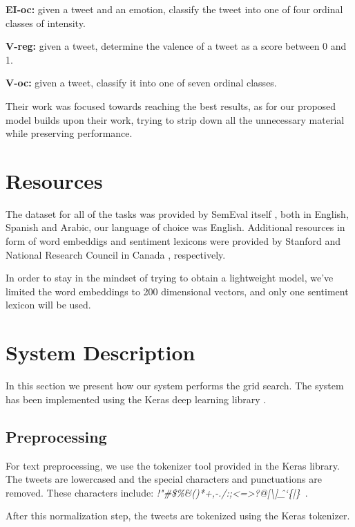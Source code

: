 \documentclass[10pt, a4paper]{article}
\begin{document}
\textbf{EI-oc:} given a tweet and an emotion, classify the tweet into one of four ordinal classes of intensity.

\textbf{V-reg:} given a tweet, determine the valence of a tweet as a score between 0 and 1.

\textbf{V-oc:} given a tweet, classify it into one of seven ordinal classes.


Their work was focused towards reaching the best results, as for our proposed model builds upon their work, trying to strip down all the unnecessary material while preserving performance.

\section{Resources}
The dataset for all of the tasks was provided by SemEval itself \citep{mohammed-semeval}, both in English, Spanish and Arabic, our language of choice was English. Additional resources in form of word embeddigs and sentiment lexicons were provided by Stanford \citep{glove} and National Research Council in Canada \citep{nrcic}, respectively. 

In order to stay in the mindset of trying to obtain a lightweight model, we've limited the word embeddings to 200 dimensional vectors, and only one sentiment lexicon will be used.


\section{System Description}
In this section we present how our system performs the grid search.
The system has been implemented using the Keras deep learning library \citep{chollet2015keras}.

\subsection{Preprocessing}
For text preprocessing, we use the tokenizer tool provided in the Keras library.
The tweets are lowercased and the special characters and
punctuations are removed.
These characters include: \textit{!"#\$\%&()*+,-./:;<=>?@[\textbackslash]\^\_`\{|\}~}.

After this normalization step, the tweets are tokenized using the Keras tokenizer.
\end{document}
